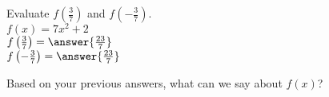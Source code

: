 \documentclass{ximera}
\author{David Kish}
\begin{document}
\begin{exercise}
Evaluate $f\left(\frac{3}{7}\right)$ and $f\left(-\frac{3}{7}\right)$.\\
$f(x)= 7x^2+ 2$\\
$f\left(\frac{3}{7}\right)=\answer{\frac{23}{7}}$\\
$f\left(-\frac{3}{7}\right)=\answer{\frac{23}{7}}$
\end{exercise}
\begin{exercise}
Based on your previous answers, what can we say about $f(x)$?
\begin{multipleChoice}
\end{multipleChoice}
\end{exercise}
\end{document}
